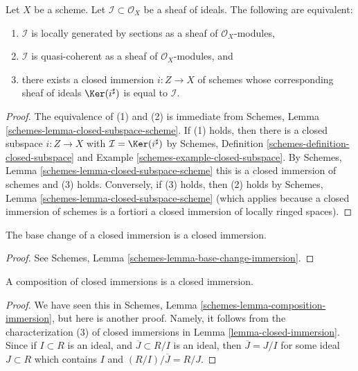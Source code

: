 \begin{lemma}
\label{lemma-closed-immersion-bijection-ideals}
Let $X$ be a scheme.
Let $\mathcal{I} \subset \mathcal{O}_X$ be a sheaf of ideals.
The following are equivalent:
\begin{enumerate}
\item $\mathcal{I}$ is locally generated by
sections as a sheaf of $\mathcal{O}_X$-modules,
\item $\mathcal{I}$ is quasi-coherent as
a sheaf of $\mathcal{O}_X$-modules, and
\item there exists a closed immersion $i : Z \to X$ of schemes whose
corresponding sheaf of ideals $\Ker(i^\sharp)$ is equal to $\mathcal{I}$.
\end{enumerate}
\end{lemma}

\begin{proof}
The equivalence of (1) and (2) is immediate from
Schemes, Lemma \ref{schemes-lemma-closed-subspace-scheme}.
If (1) holds, then there is a closed subspace $i : Z \to X$
with $\mathcal{I} = \Ker(i^\sharp)$ by
Schemes, Definition \ref{schemes-definition-closed-subspace}
and Example \ref{schemes-example-closed-subspace}.
By Schemes, Lemma \ref{schemes-lemma-closed-subspace-scheme}
this is a closed immersion of schemes and (3) holds.
Conversely, if (3) holds, then (2) holds by
Schemes, Lemma \ref{schemes-lemma-closed-subspace-scheme}
(which applies because a closed immersion of schemes is a fortiori a
closed immersion of locally ringed spaces).
\end{proof}

\begin{lemma}
\label{lemma-base-change-closed-immersion}
The base change of a closed immersion is a closed immersion.
\end{lemma}

\begin{proof}
See Schemes, Lemma \ref{schemes-lemma-base-change-immersion}.
\end{proof}

\begin{lemma}
\label{lemma-composition-closed-immersion}
A composition of closed immersions is a closed immersion.
\end{lemma}

\begin{proof}
We have seen this in
Schemes, Lemma \ref{schemes-lemma-composition-immersion},
but here is another
proof. Namely, it follows from the characterization (3) of closed immersions
in Lemma \ref{lemma-closed-immersion}. Since if $I \subset R$
is an ideal, and $\overline{J} \subset R/I$ is an ideal, then
$\overline{J} = J/I$ for some ideal $J \subset R$ which contains
$I$ and $(R/I)/\overline{J} = R/J$.
\end{proof}

